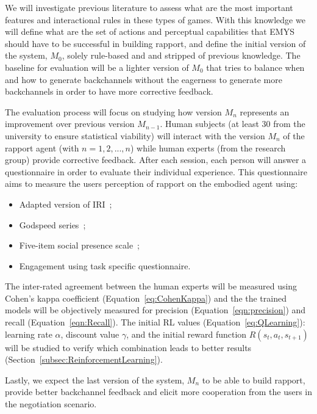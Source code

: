 We will investigate previous literature to assess what are the most important features and interactional rules in these types of games. With this knowledge we will define what are the set of actions and perceptual capabilities that \ac{EMYS} should have to be successful in building rapport, and define the initial version of the system, $M_0$, solely rule-based and and stripped of previous knowledge. The baseline for evaluation will be a lighter version of $M_0$ that tries to balance when and how to generate backchannels without the eagerness to generate more backchannels in order to have more corrective feedback.

The evaluation process will focus on studying how version $M_n$ represents an improvement over previous version $M_{n-1}$. Human subjects (at least 30 from the university to ensure statistical viability) will interact with the version $M_n$ of the rapport agent (with $n={1,2,...,n}$) while human experts (from the research group) provide corrective feedback. After each session, each person will answer a questionnaire in order to evaluate their individual experience. This questionnaire aims to measure the users perception of rapport on the embodied agent using:

\begin{itemize}
	\item Adapted version of \acf{IRI}~\cite{Davis1980};
	\item Godspeed series~\cite{Bartneck2009};
	\item Five-item social presence scale~\cite{Bailenson2001};
	\item Engagement using task specific questionnaire.
\end{itemize}

The inter-rated agreement between the human experts will be measured using Cohen’s kappa coefficient (Equation~\ref{eq:CohenKappa}) and the the trained models will be objectively measured for precision (Equation~\ref{eqn:precision}) and recall (Equation~\ref{eqn:Recall}). The initial \ac{RL} values (Equation~\ref{eq:QLearning}): learning rate $\alpha$, discount value $\gamma$, and the initial reward function $R(s_t,a_t,s_{t+1})$ will be studied to verify which combination leads to better results (Section~\ref{subsec:ReinforcementLearning}).

Lastly, we expect the last version of the system, $M_n$ to be able to build rapport, provide better backchannel feedback and elicit more cooperation from the users in the negotiation scenario.

